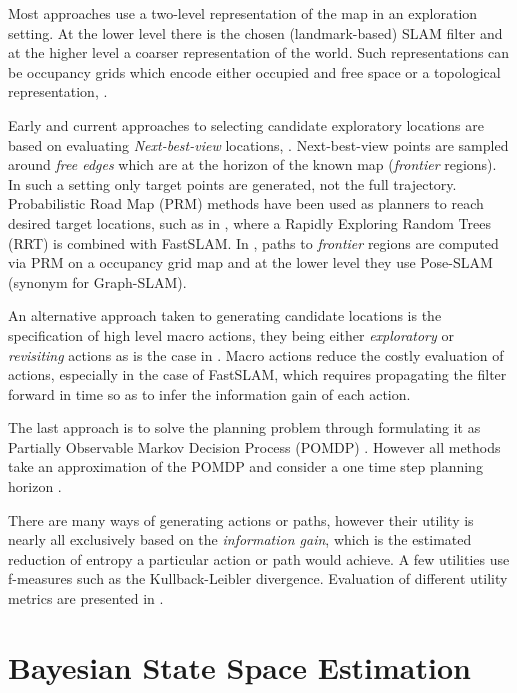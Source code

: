 Most approaches use a two-level representation of the map in an exploration setting. At the lower level
there is the chosen (landmark-based) SLAM filter and at the higher level a coarser representation of the world.
Such representations can be occupancy grids \citep{Thrun_grid_based_1996} which encode either occupied and free space
or a topological representation, \cite{Kollar_2008_Exploration_SLAM}.

Early and current approaches to selecting candidate exploratory locations are based on evaluating 
\textit{Next-best-view} locations, \cite{Navigation_strategires_for_exploring_indoor_environments}. Next-best-view points are 
sampled around \textit{free edges} which are at the horizon of the known map (\textit{frontier} regions). 
In such a setting only target points are generated, not the full trajectory. Probabilistic Road Map (PRM) \citep{PRM_1996}
methods have been used as planners to reach desired target locations, such as in \cite{RRT-SLAM}, where a Rapidly
Exploring Random Trees (RRT) is combined with FastSLAM. In \cite{ActivePosSLAM}, paths to \textit{frontier} regions are computed
via PRM  on a occupancy grid map and at the lower level they use Pose-SLAM (synonym for Graph-SLAM).

An alternative approach taken to generating candidate locations is the specification of high level macro actions, they being either 
\textit{exploratory} or \textit{revisiting} actions as is the case in \cite{stachniss05robotics}. Macro actions
reduce the costly evaluation of actions, especially in the case of FastSLAM, which requires propagating the filter 
forward in time so as to infer the information gain of each action.

The last approach is to solve the planning problem through formulating it as  Partially Observable Markov Decision Process (POMDP) \citep{Ross08onlineplanning}. 
However all methods take an approximation of the POMDP and consider a one time step planning horizon \cite[p.37]{GeorgiosLidoris}.

There are many ways of generating actions or paths, however their utility is nearly all exclusively based on the \textit{information gain}, 
which is the estimated reduction of entropy a particular action or path would achieve. A few utilities use f-measures such as the Kullback-Leibler divergence. 
Evaluation of different utility metrics are presented in \cite{Active_SLAM_Uncertainty_compar}.



\section{Bayesian State Space Estimation}\label{ch5:BSSE}

